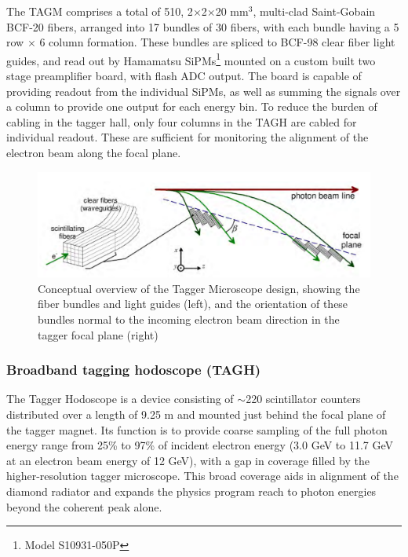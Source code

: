 The TAGM comprises a total of 510, 2$\times$2$\times$20 mm$^3$, multi-clad Saint-Gobain BCF-20 fibers, arranged into 17 bundles of 30 fibers, with each bundle having a 5 row $\times$ 6 column formation. These bundles are spliced to BCF-98 clear fiber light guides, and read out by Hamamatsu SiPMs\footnote{Model S10931-050P} mounted on a custom built two stage preamplifier board, with flash ADC output.
The board is capable of providing readout from the individual SiPMs, as well as summing the signals over a column to provide one output for each energy bin.
To reduce the burden of cabling in the tagger hall, only four columns in the TAGH are cabled for individual readout.
These are sufficient for monitoring the alignment of the electron beam along the focal plane.

\begin{figure}[ht]
\begin{center}
 \includegraphics[clip=true,width=0.95\linewidth]{figures/TAGM_conceptual.pdf}
\end{center}
\caption{Conceptual overview of the Tagger Microscope design, showing the fiber bundles and light guides (left), and the orientation of these bundles normal to the incoming electron beam direction in the tagger focal plane (right)
        }
\label{fig:TAGM_conceptual} 
\end{figure}

\subsubsection{Broadband tagging hodoscope (TAGH)}\label{sec:TAGHIntro}
The Tagger Hodoscope is a device consisting of $\sim$220 scintillator counters distributed over a length of 9.25 m and mounted just behind the focal plane of the tagger magnet.
Its function is to provide coarse sampling of the full photon energy range from 25\% to 97\% of incident electron energy (3.0 GeV to 11.7 GeV at an electron beam energy of 12 GeV), with a gap in coverage filled by the higher-resolution tagger microscope.
This broad coverage aids in alignment of the diamond radiator and expands the \GX{} physics program reach to photon energies beyond the coherent peak alone.

